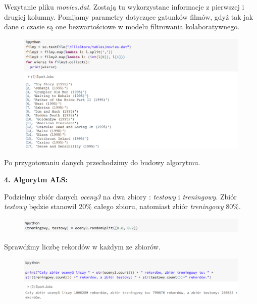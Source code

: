 \documentclass[12pt,a4paper]{report}
\begin{document}
Wczytanie pliku \textit{movies.dat}. 
Zostają tu wykorzystane informacje z pierwszej i drugiej kolumny. Pomijamy parametry dotyczące gatunków filmów, gdyż tak jak dane o czasie są one bezwartościowe w modelu filtrowania kolaboratywnego.

\begin{figure}[H]
\includegraphics[scale=0.5]{obrazy/ALS5.PNG} 
\end{figure}

Po przygotowaniu danych przechodzimy do budowy algorytmu.
\bigskip

\textbf{4. Algorytm ALS:}

Podzielmy zbiór danych \textit{oceny3} na dwa zbiory : \textit{testowy} i \textit{treningowy}.
Zbiór \textit{testowy} będzie stanowił 20\% całego zbioru, natomiast zbiór \textit{treningowy} 80\%.

\begin{figure}[H]
\includegraphics[scale=0.5]{obrazy/ALS6.PNG} 
\end{figure}

Sprawdźmy liczbę rekordów w każdym ze zbiorów.

\begin{figure}[H]
\includegraphics[scale=0.5]{obrazy/ALS7.PNG} 
\end{figure}
\end{document}
